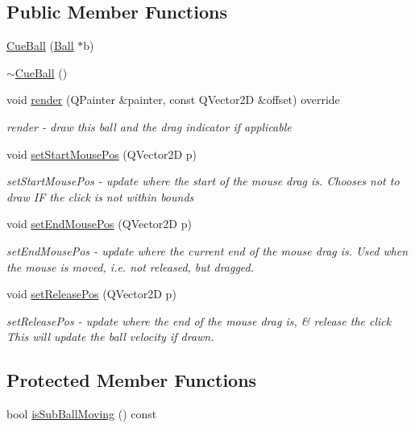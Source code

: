 \subsection*{Public Member Functions}
\begin{DoxyCompactItemize}
\item 
\mbox{\hyperlink{class_cue_ball_a9a5dd540283fcd724b7f1a3bce11fbf0}{Cue\+Ball}} (\mbox{\hyperlink{class_ball}{Ball}} $\ast$b)
\item 
\mbox{\hyperlink{class_cue_ball_a4cd3c714cdfc9f5dd9aeaa325f01bb18}{$\sim$\+Cue\+Ball}} ()
\item 
void \mbox{\hyperlink{class_cue_ball_a915a83205e4cfc720fbd884b045e2f81}{render}} (Q\+Painter \&painter, const Q\+Vector2D \&offset) override
\begin{DoxyCompactList}\small\item\em render -\/ draw this ball and the drag indicator if applicable \end{DoxyCompactList}\item 
void \mbox{\hyperlink{class_cue_ball_aa6165c3e37540234b621402e02c1c97c}{set\+Start\+Mouse\+Pos}} (Q\+Vector2D p)
\begin{DoxyCompactList}\small\item\em set\+Start\+Mouse\+Pos -\/ update where the start of the mouse drag is. Chooses not to draw IF the click is not within bounds \end{DoxyCompactList}\item 
void \mbox{\hyperlink{class_cue_ball_a297112b81595f308f717410f74d03d3c}{set\+End\+Mouse\+Pos}} (Q\+Vector2D p)
\begin{DoxyCompactList}\small\item\em set\+End\+Mouse\+Pos -\/ update where the current end of the mouse drag is. Used when the mouse is moved, i.\+e. not released, but dragged. \end{DoxyCompactList}\item 
void \mbox{\hyperlink{class_cue_ball_a8aafe19b8226adfcca93621baeef29f4}{set\+Release\+Pos}} (Q\+Vector2D p)
\begin{DoxyCompactList}\small\item\em set\+Release\+Pos -\/ update where the end of the mouse drag is, \& release the click This will update the ball velocity if drawn. \end{DoxyCompactList}\end{DoxyCompactItemize}
\subsection*{Protected Member Functions}
\begin{DoxyCompactItemize}
\item 
bool \mbox{\hyperlink{class_cue_ball_a7035345f6ba5c29052a5a1444e3f076f}{is\+Sub\+Ball\+Moving}} () const
\end{DoxyCompactItemize}

